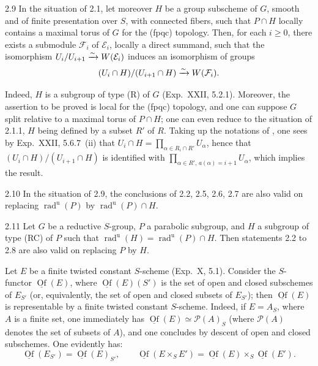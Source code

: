 \begin{corollary}{2.9}\label{XXVI.2.9}
In the situation of 2.1, let moreover $H$ be a group subscheme of $G$, smooth and of finite presentation over $S$, with connected fibers, such that $P\cap H$ locally contains a maximal torus of $G$ for the (fpqc) topology. Then, for each $i\ge0$, there exists a submodule $\mathcal F_i$ of $\mathcal E_i$, locally a direct summand, such that the isomorphism $U_i/U_{i+1}\xrightarrow{\sim} W(\mathcal E_i)$ induces an isomorphism of groups
\[
(U_i\cap H)/(U_{i+1}\cap H)\xrightarrow{\sim} W(\mathcal F_i).
\]
\end{corollary}
Indeed, $H$ is a subgroup of type (R) of $G$ (Exp.~XXII, 5.2.1). Moreover, the assertion to be proved is local for the (fpqc) topology, and one can suppose $G$ split relative to a maximal torus of $P\cap H$; one can even reduce to the situation of 2.1.1, $H$ being defined by a subset $R'$ of $R$. Taking up the notations of \loccit, one sees by Exp.~XXII, 5.6.7~(ii) that $U_i\cap H=\prod_{\alpha\in R_i\cap R'}U_\alpha$, hence that $(U_i\cap H)/(U_{i+1}\cap H)$ is identified with $\prod_{\alpha\in R',\,a(\alpha)=i+1}U_\alpha$, which implies the result.
\begin{corollary}{2.10}\label{XXVI.2.10}
In the situation of 2.9, the conclusions of 2.2, 2.5, 2.6, 2.7 are also valid on replacing $\operatorname{rad}^{\mathrm u}(P)$ by $\operatorname{rad}^{\mathrm u}(P)\cap H$.
\end{corollary}
\begin{corollary}{2.11}\label{XXVI.2.11}
Let $G$ be a reductive $S$-group, $P$ a parabolic subgroup, and $H$ a subgroup of type (RC) of $P$ such that $\operatorname{rad}^{\mathrm u}(H)=\operatorname{rad}^{\mathrm u}(P)\cap H$. Then statements 2.2 to 2.8 are also valid on replacing $P$ by $H$.
\end{corollary}

\label{XXVI.3.1}
Let $E$ be a finite twisted constant $S$-scheme (Exp.~X, 5.1). Consider the $S$-functor $\underline{\operatorname{Of}}(E)$, where $\underline{\operatorname{Of}}(E)(S')$ is the set of open and closed subschemes of $E_{S'}$ (or, equivalently, the set of open and closed subsets of $E_{S'}$); then $\underline{\operatorname{Of}}(E)$ is representable by a finite twisted constant $S$-scheme. Indeed, if $E=A_S$, where $A$ is a finite set, one immediately has $\underline{\operatorname{Of}}(E)\simeq\mathscr P(A)_S$ (where $\mathscr P(A)$ denotes the set of subsets of $A$), and one concludes by descent of open and closed subschemes. One evidently has:
\[
\underline{\operatorname{Of}}(E_{S'})=\underline{\operatorname{Of}}(E)_{S'},\qquad
\underline{\operatorname{Of}}(E\times_S E')=\underline{\operatorname{Of}}(E)\times_S\underline{\operatorname{Of}}(E').
\]

